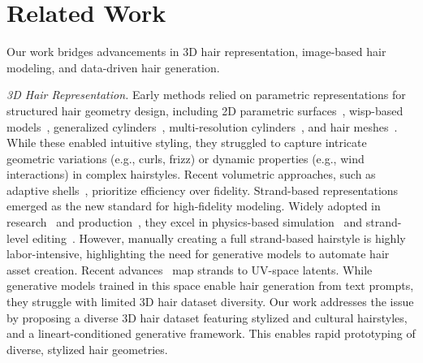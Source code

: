 
\section{Related Work}
\label{sec:related}

Our work bridges advancements in 3D hair representation, image-based hair modeling, and data-driven hair generation.

\vspace{4pt}
\noindent \textit{3D Hair Representation.}
Early methods relied on parametric representations for structured hair geometry design, including 2D parametric surfaces~\cite{koh2000real,liang2003enhanced,noble2004modelling}, wisp-based models~\cite{watanabe1992trigonal}, generalized cylinders~\cite{chen1999system,choe2005statistical,patrick2004modelling,xu2001v,yang2000cluster}, multi-resolution cylinders~\cite{kim2002interactive,wang2004hair}, and hair meshes~\cite{yuksel2009hair,bhokare2024real}. While these enabled intuitive styling, they struggled to capture intricate geometric variations (e.g., curls, frizz) or dynamic properties (e.g., wind interactions) in complex hairstyles. Recent volumetric approaches, such as adaptive shells~\cite{wang2023adaptive}, prioritize efficiency over fidelity.
%
Strand-based representations emerged as the new standard for high-fidelity modeling. Widely adopted in research~\cite{piuze2011generalized,shen2023ct2hair} and production~\cite{chiang2015practical,fascione2018path}, they excel in physics-based simulation~\cite{daviet2023interactive,fei2017multi,hsu2023sag,herrera2024augmented,digitalsalon} and strand-level editing~\cite{xing2019hairbrush}. However, manually creating a full strand-based hairstyle is highly labor-intensive, highlighting the need for generative models to automate hair asset creation.
Recent advances~\cite{HAAR:CVPR:2024} map strands to UV-space latents. While generative models trained in this space enable hair generation from text prompts, they struggle with limited 3D hair dataset diversity.
%
Our work addresses the issue by proposing a diverse 3D hair dataset featuring stylized and cultural hairstyles, and a lineart-conditioned generative framework. This enables rapid prototyping of diverse, stylized hair geometries.



